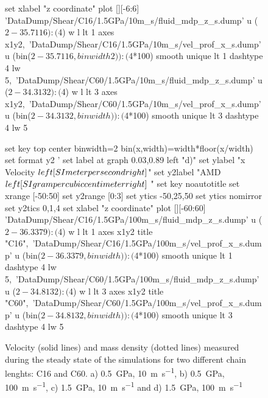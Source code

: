 \documentclass[5p]{elsarticle}
\begin{document}
\begin{figure}[htp]
\begin{center}
\begin{gnuplot}[terminal=epslatex, terminaloptions={size \SERFigwidth cm, \SERFigheight cm color solid}]
			set xlabel "z coordinate"  
			plot  	[][-6:6]  'DataDump/Shear/C16/1.5GPa/10m_s/fluid_mdp_z_s.dump' u ($2-35.7116):($4) w l  lt 1 axes x1y2,\ 								
				              'DataDump/Shear/C16/1.5GPa/10m_s/vel_prof_x_s.dump'  u (bin($2-35.7116,binwidth2)):($4*100) smooth unique lt 1 dashtype 4  lw 5,\	
                             		    'DataDump/Shear/C60/1.5GPa/10m_s/fluid_mdp_z_s.dump' u ($2-34.3132):($4) w l  lt 3  axes x1y2,\ 								
				              'DataDump/Shear/C60/1.5GPa/10m_s/vel_prof_x_s.dump'  u (bin($2-34.3132,binwidth)):($4*100) smooth unique lt 3 dashtype 4  lw 5		
		\end{gnuplot}
		\begin{gnuplot}[terminal=epslatex, terminaloptions={size \SERFigwidth cm, \SERFigheight cm color solid}]
		set key top center
			binwidth=2
			bin(x,width)=width*floor(x/width)
			set format y2 '%
			set label at graph 0.03,0.89 left "d)"
			set ylabel "x Velocity $\\left[ \\SI{}{\\meter\\per\\second} \\right]$"
			set y2label "AMD $\\left[ \\SI{}{\\gram\\per\\cubic\\centi\\meter} \\right]$ "
			set key noautotitle
			set xrange [-50:50]
			set y2range [0:3]
			set ytics  -50,25,50
			set ytics nomirror
			set y2tics 0,1,4
			set xlabel "z coordinate"  
			plot  	[][-60:60]  'DataDump/Shear/C16/1.5GPa/100m_s/fluid_mdp_z_s.dump' u ($2-36.3379):($4) w l  lt 1 axes x1y2 title "C16",\ 						
				              'DataDump/Shear/C16/1.5GPa/100m_s/vel_prof_x_s.dump'  u (bin($2-36.3379,binwidth)):($4*100) smooth unique lt 1 dashtype 4  lw 5,\ 
                             		     'DataDump/Shear/C60/1.5GPa/100m_s/fluid_mdp_z_s.dump' u ($2-34.8132):($4) w l  lt 3  axes x1y2 title "C60",\ 						
				              'DataDump/Shear/C60/1.5GPa/100m_s/vel_prof_x_s.dump'  u (bin($2-34.8132,binwidth)):($4*100) smooth unique lt 3 dashtype 4  lw 5 	
		\end{gnuplot}
		
		\caption{Velocity (solid lines) and mass density (dotted lines) measured during the steady state of the simulations for two different chain lenghts: C16 and C60. a) \SI{0.5}{\giga\pascal},  \SI{10}{\meter\per\second},   b) \SI{0.5}{\giga\pascal},  \SI{100}{\meter\per\second}, c) \SI{1.5}{\giga\pascal},  \SI{10}{\meter\per\second} and    d) \SI{1.5}{\giga\pascal},  \SI{100}{\meter\per\second}} 
		\label{fig:VelProf_MDP2}
	\end{center}
 \end{figure}
\end{document}
